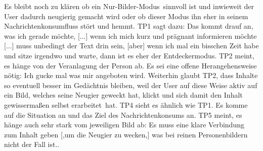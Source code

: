 \documentclass[12pt,a4paper,bibtotoc,abstracton]{scrartcl}
\begin{document}
Es bleibt noch zu klären ob ein \glqq Nur-Bilder-Modus\grqq\ sinnvoll ist und inwieweit der User dadurch neugierig gemacht wird oder ob dieser Modus ihn eher in seinem Nachrichtenkonsumfluss stört und hemmt. TP1 sagt dazu: \glqq Das kommt drauf an, was ich gerade möchte, [...] wenn ich mich kurz und prägnant informieren möchte [...] muss unbedingt der Text drin sein, [aber] wenn ich mal ein bisschen Zeit habe und sitze irgendwo und warte, dann ist es eher der Entdeckermodus\grqq. TP2 meint, es hänge von der Veranlagung der Person ab. Es sei eine offene Herangehensweise nötig: \glqq Ich gucke mal was mir angeboten wird\grqq. Weiterhin glaubt TP2, dass Inhalte so eventuell besser im Gedächtnis bleiben, weil der User auf diese Weise aktiv auf ein Bild, welches seine Neugier geweckt hat, klickt und sich damit den Inhalt gewissermaßen selbst \glqq erarbeitet\grqq\ hat. TP4 sieht es ähnlich wie TP1. Es komme auf die Situation an und das Ziel des Nachrichtenkonsums an. TP5 meint, es hänge auch sehr stark vom jeweiligen Bild ab: \glqq Es muss eine klare Verbindung zum Inhalt geben [,um die Neugier zu wecken,] was bei reinen Personenbildern nicht der Fall ist.\grqq. 
\end{document}
